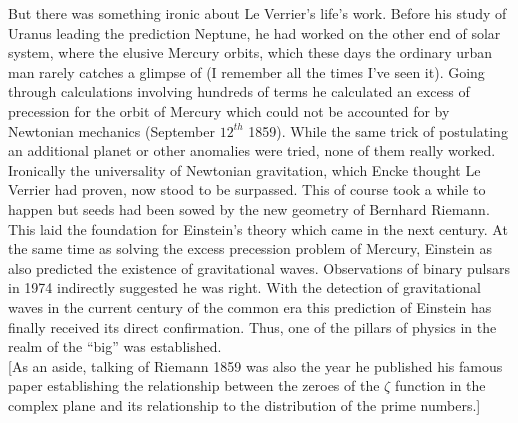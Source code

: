 \documentclass[11pt]{article} %
\numberwithin{equation}{section}
\begin{document}
But there was something ironic about Le Verrier’s life’s work. Before his study of Uranus leading the prediction Neptune, he had worked on the other end of solar system, where the elusive Mercury orbits, which these days the ordinary urban man rarely catches a glimpse of (I remember all the times I’ve seen it). Going through calculations involving hundreds of  terms he calculated an excess of  precession for the orbit of Mercury which could not be accounted for by Newtonian mechanics (September $12^{th}$ 1859).  While the same trick of postulating an additional planet or other anomalies were tried, none of them really worked. Ironically the universality of Newtonian gravitation, which Encke thought Le Verrier had proven, now stood to be surpassed. This of course took a while to happen but seeds had been sowed by the new geometry of Bernhard Riemann. This laid the foundation for Einstein’s theory which came in the next century. At the same time as solving the excess precession problem of Mercury, Einstein as also predicted the existence of gravitational waves. Observations of binary pulsars in 1974 indirectly suggested he was right. With the detection of gravitational waves in the current century of the common era this prediction of Einstein has finally received its direct confirmation. Thus, one of the pillars of physics in the realm of the “big” was established.\\

[As an aside, talking of Riemann 1859 was also the year he published his famous paper establishing the relationship between the zeroes of the $\zeta$ function in the complex plane and its relationship to the distribution of the prime numbers.]
\end{document}
